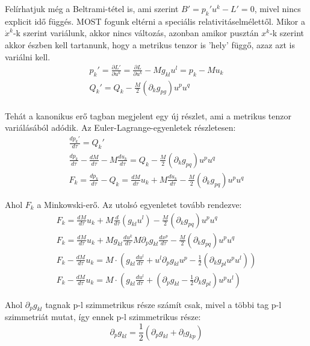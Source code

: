 \documentclass[a4paper,12pt]{article}
\begin{document}
\par Felírhatjuk még a Beltrami-tétel is, ami szerint $B' = p_{k}'u^{k} - L' = 0$, mivel nincs explicit idő függés. MOST fogunk eltérni a speciális relativitáselmélettől. Mikor a $\dot{x}^{k}$-k szerint variálunk, akkor nincs változás, azonban amikor pusztán $x^{k}$-k szerint akkor észben kell tartanunk, hogy a metrikus tenzor is 'hely' függő, azaz azt is variálni kell.
\begin{gather*}
    p_{k}' = \frac{\partial L'}{\partial u^{k}} = \frac{\partial L}{\partial u^{k}} - Mg_{kl}u^{l} = p_{k} - Mu_{k}\\
    Q_{k}' = Q_{k} - \frac{M}{2}(\partial_{k}g_{pg})u^{p}u^{q} \\
\end{gather*}
\par Tehát a kanonikus erő tagban megjelent egy új részlet, ami a metrikus tenzor variálásából adódik. Az Euler-Lagrange-egyenletek részletesen:
\begin{gather*}
    \frac{dp_{k}'}{d\tau} = Q_{k}' \\
    \frac{dp_{k}}{d\tau} - \frac{dM}{d\tau} - M\frac{du_{k}}{d\tau} = Q_{k} - \frac{M}{2}(\partial_{k}g_{pq})u^{p}u^{q} \\
    F_{k} = \frac{dp_{k}}{d\tau} - Q_{k} = \frac{dM}{d\tau}u_{k} + M\frac{du_{k}}{d\tau} - \frac{M}{2}(\partial_{k}g_{pq})u^{p}u^{q}
\end{gather*}
\par Ahol $F_{k}$ a Minkowski-erő. Az utolsó egyenletet tovább rendezve:
\begin{gather*}
    F_{k} = \frac{dM}{d\tau}u_{k} + M\frac{d}{d\tau}(g_{kl}u^{l}) - \frac{M}{2}(\partial_{k}g_{pq})u^{p}u^{q} \\
    F_{k} = \frac{dM}{d\tau}u_{k} + Mg_{kl}\frac{du^{k}}{d\tau} M\partial_{p}g_{kl}\frac{dx^{p}}{d\tau} - \frac{M}{2}(\partial_{k}g_{pq})u^{p}u^{q} \\
    F_{k} - \frac{dM}{d\tau}u_{k} = M\cdot(g_{kl}\frac{du^{l}}{d\tau} + u^{l}\partial_{p}g_{kl}u^{p} - \frac{1}{2}(\partial_{k}g_{pl}u^{p}u^{l})) \\
    F_{k} - \frac{dM}{d\tau}u_{k} = M\cdot(g_{kl}\frac{du^{l}}{d\tau} + (\partial_{p}g_{kl} - \frac{1}{2}\partial_{k}g_{pl})u^{p}u^{l})
\end{gather*}
\par Ahol $\partial_{p}g_{kl}$ tagnak p-l szimmetrikus része számít csak, mivel a többi tag p-l szimmetriát mutat, így ennek p-l szimmetrikus része:
\begin{equation*}
    \partial_{p}g_{kl} = \frac{1}{2}(\partial_{p}g_{kl} + \partial_{l}g_{kp})
\end{equation*}
\end{document}

